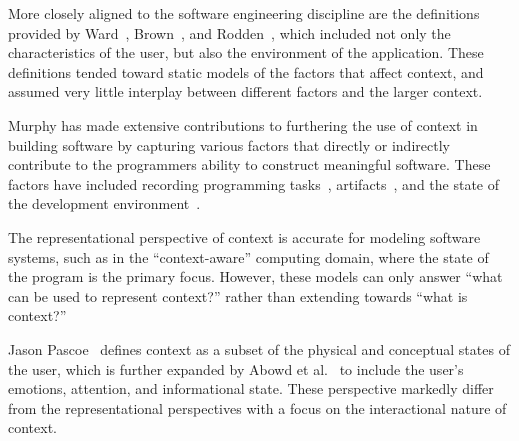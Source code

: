 More closely aligned to the software engineering discipline are the definitions provided by Ward~\cite{Ward:1997}, Brown~\cite{Brown:1995}, and Rodden~\cite{Rodden:1998}, which included not only the characteristics of the user, but also the environment of the application. These definitions tended toward static models of the factors that affect context, and assumed very little interplay between different factors and the larger context.


Murphy has made extensive contributions to furthering the use of context in building software by capturing various factors that directly or indirectly contribute to the programmers ability to construct meaningful software. These factors have included recording programming tasks~\cite{Kersten:2006}, artifacts~\cite{Vcubranic:2003}, and the state of the development environment~\cite{Gasparic:2017}.


The representational perspective of context is accurate for modeling software systems, such as in the ``context-aware'' computing domain, where the state of the program is the primary focus. However, these models can only answer ``what can be used to represent context?'' rather than extending towards ``what is context?''


Jason Pascoe~\citep{Pascoe:1998} defines context as a subset of the physical and conceptual states of the user, which is further expanded by Abowd et al.~\cite{Abowd:1999} to include the user's emotions, attention, and informational state. These perspective markedly differ from the representational perspectives with a focus on the interactional nature of context.

